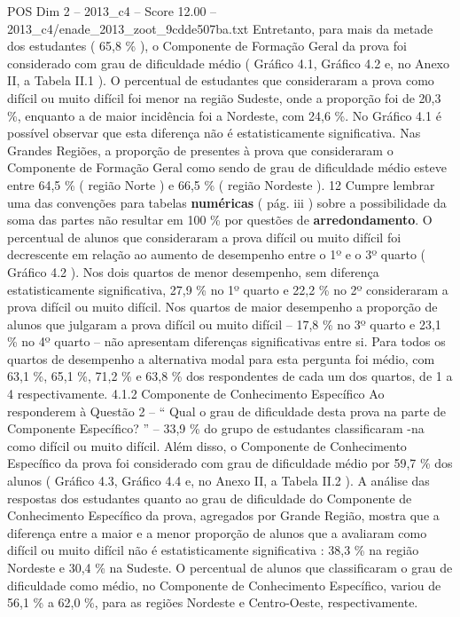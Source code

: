 \begin{textsample}{POS Dim 2 – 2013\_c4 – Score 12.00 – 2013\_c4/enade\_2013\_zoot\_9cdde507ba.txt}
Entretanto, para mais da metade dos estudantes ( 65,8 \% ), o Componente de Formação Geral da prova foi considerado com grau de dificuldade médio ( Gráfico 4.1, Gráfico 4.2 e, no Anexo II, a Tabela II.1 ).
O percentual de estudantes que consideraram a prova como difícil ou muito difícil foi menor na região Sudeste, onde a proporção foi de 20,3 \%, enquanto a de maior incidência foi a Nordeste, com 24,6 \%.
No Gráfico 4.1 é possível observar que esta diferença não é estatisticamente significativa.
Nas Grandes Regiões, a proporção de presentes à prova que consideraram o Componente de Formação Geral como sendo de grau de dificuldade médio esteve entre 64,5 \% ( região Norte ) e 66,5 \% ( região Nordeste ). 12 Cumpre lembrar uma das convenções para tabelas \textbf{numéricas} ( pág. iii ) sobre a possibilidade da soma das partes não resultar em 100 \% por questões de \textbf{arredondamento}.
O percentual de alunos que consideraram a prova difícil ou muito difícil foi decrescente em relação ao aumento de desempenho entre o 1º e o 3º quarto ( Gráfico 4.2 ).
Nos dois quartos de menor desempenho, sem diferença estatisticamente significativa, 27,9 \% no 1º quarto e 22,2 \% no 2º consideraram a prova difícil ou muito difícil.
Nos quartos de maior desempenho a proporção de alunos que julgaram a prova difícil ou muito difícil – 17,8 \% no 3º quarto e 23,1 \% no 4º quarto – não apresentam diferenças significativas entre si.
Para todos os quartos de desempenho a alternativa modal para esta pergunta foi médio, com 63,1 \%, 65,1 \%, 71,2 \% e 63,8 \% dos respondentes de cada um dos quartos, de 1 a 4 respectivamente. 4.1.2 Componente de Conhecimento Específico Ao responderem à Questão 2 – “ Qual o grau de dificuldade desta prova na parte de Componente Específico? ” – 33,9 \% do grupo de estudantes classificaram -na como difícil ou muito difícil.
Além disso, o Componente de Conhecimento Específico da prova foi considerado com grau de dificuldade médio por 59,7 \% dos alunos ( Gráfico 4.3, Gráfico 4.4 e, no Anexo II, a Tabela II.2 ).
A análise das respostas dos estudantes quanto ao grau de dificuldade do Componente de Conhecimento Específico da prova, agregados por Grande Região, mostra que a diferença entre a maior e a menor proporção de alunos que a avaliaram como difícil ou muito difícil não é estatisticamente significativa : 38,3 \% na região Nordeste e 30,4 \% na Sudeste.
O percentual de alunos que classificaram o grau de dificuldade como médio, no Componente de Conhecimento Específico, variou de 56,1 \% a 62,0 \%, para as regiões Nordeste e Centro-Oeste, respectivamente.

\end{textsample}
